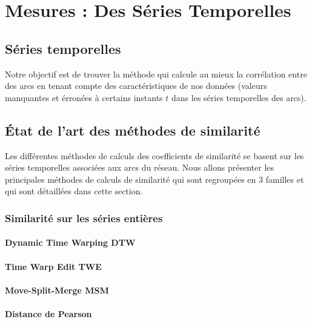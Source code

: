 

\chapter{Mesures : Des S\'eries Temporelles}
\label{timeSeries}


\section{S\'eries temporelles}



Notre objectif est de trouver la m\'ethode qui calcule au mieux la corr\'elation entre des arcs en tenant compte des caract\'eristiques de nos donn\'ees (valeurs manquantes et \'erron\'ees \`a certains instants $t$ dans les s\'eries temporelles des arcs).


\section{\'Etat de l'art des m\'ethodes de similarit\'e}
Les diff\'erentes m\'ethodes de calculs des coefficients de similarit\'e se basent sur les s\'eries temporelles associ\'ees aux arcs du r\'eseau.
Nous allons pr\'esenter les principales m\'ethodes de calculs de similarit\'e qui sont regroup\'ees en $3$ familles et qui sont d\'etaill\'ees dans cette section.
\subsection{ Similarit\'e sur les s\'eries enti\`eres}
	\label{seriesEntieres}
	
	\subsubsection{Dynamic Time Warping  DTW}
		
	\subsubsection{Time Warp Edit TWE}
		
	\subsubsection{Move-Split-Merge MSM}
		
	\subsubsection{Distance de Pearson}
		

